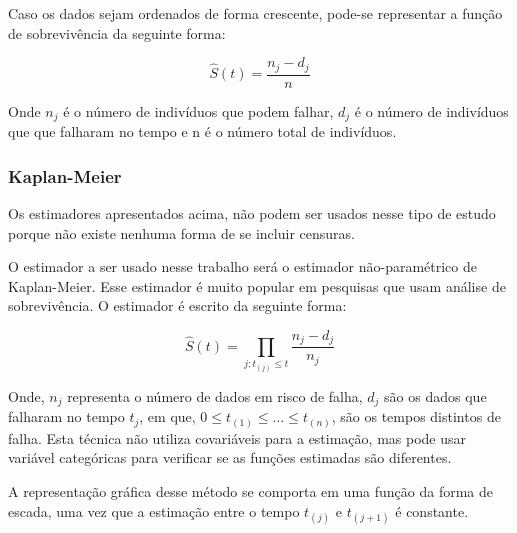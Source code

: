 \documentclass[12pt,a4paper]{article}
\begin{document}
Caso os dados sejam ordenados de forma crescente, pode-se representar a função de sobrevivência da seguinte forma:

$$ \hat{S}(t) = \dfrac{n_j - d_j}{n} $$

Onde $n_j$ é o número de indivíduos que podem falhar, $d_j$ é o número de indivíduos que que falharam no tempo e n é o número total de indivíduos.

\subsubsection{Kaplan-Meier}

Os estimadores apresentados acima, não podem ser usados nesse tipo de estudo porque não existe nenhuma forma de se incluir censuras.

O estimador a ser usado nesse trabalho será o estimador não-paramétrico de Kaplan-Meier. Esse estimador é muito popular em pesquisas que usam análise de sobrevivência. O estimador é escrito da seguinte forma:

$$ \hat{S}(t) = \prod_{j:t_{(j)}\le t} \dfrac{n_j - d_j}{n_j}$$

Onde, $n_j$ representa o número de dados em risco de falha, $d_j$ são os dados que falharam no tempo $t_j$, em que, $0 \le t_{(1)} \le \hdots \le t_{(n)}$, são os tempos distintos de falha. Esta técnica não utiliza covariáveis para a estimação, mas pode usar variável categóricas para verificar se as funções estimadas são diferentes. 

A representação gráfica desse método se comporta em uma função da forma de escada, uma vez que a estimação entre o tempo $t_{(j)}$ e $t_{(j+1)}$ é constante.
\end{document}
